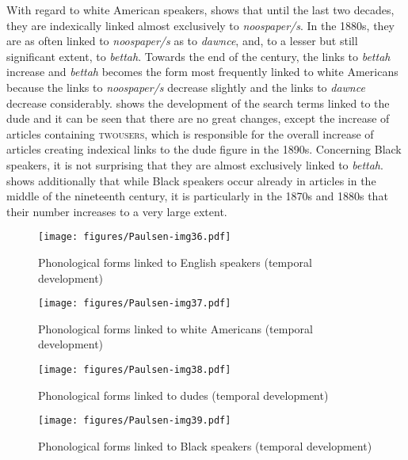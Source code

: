With regard to white American speakers,  shows that until the last two decades, they are indexically linked almost exclusively to \emph{noospaper/s}. In the 1880s, they are as often linked to \emph{noospaper/s} as to \emph{dawnce}, and, to a lesser but still significant extent, to \emph{bettah}. Towards the end of the century, the links to \emph{bettah} increase and \emph{bettah} becomes the form most frequently linked to white Americans because the links to \emph{noospaper/s} decrease slightly and the links to \emph{dawnce} decrease considerably.  shows the development of the search terms linked to the dude and it can be seen that there are no great changes, except the increase of articles containing \textsc{twousers}, which is responsible for the overall increase of articles creating indexical links to the dude figure in the 1890s. Concerning Black speakers, it is not surprising that they are almost exclusively linked to \emph{bettah}.  shows additionally that while Black speakers occur already in articles in the middle of the nineteenth century, it is particularly in the 1870s and 1880s that their number increases to a very large extent.

\begin{figure}
\texttt{[image: figures/Paulsen-img36.pdf]}
\caption{
Phonological forms linked to English speakers (temporal development)
}
\label{fig:key:36}
\end{figure}
\begin{figure}
\texttt{[image: figures/Paulsen-img37.pdf]}
\caption{
Phonological forms linked to white Americans (temporal development)
}
\label{fig:key:37}
\end{figure}
\begin{figure}
\texttt{[image: figures/Paulsen-img38.pdf]}
\caption{
Phonological forms linked to dudes (temporal development)
}
\label{fig:key:38}
\end{figure}
\begin{figure}
\texttt{[image: figures/Paulsen-img39.pdf]}
\caption{
Phonological forms linked to Black speakers (temporal development)
}
\label{fig:key:39}
\end{figure}

